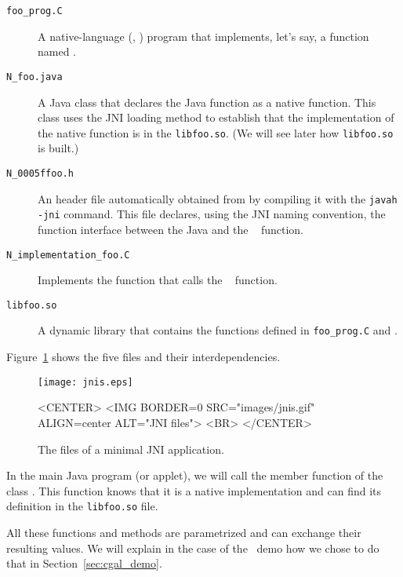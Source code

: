 \begin{description}
\item[{\tt foo\_prog.C}] A native-language (\eg, \CC) program
      that implements, let's say, a function named .
\item[{\tt N\_foo.java}]  A Java class that declares the
     Java function  as a native function. This class uses the
     JNI loading method  to establish that
     the implementation of the native function is in the \texttt{libfoo.so}.
     (We will see later how \texttt{libfoo.so} is built.)
\item[{\tt N\_0005ffoo.h}] An header file automatically obtained 
      from  by compiling it with the \texttt{javah -jni} 
      command. This file declares, using the JNI naming convention, the 
       function interface between the Java  
      and the \CC\  function.
\item[{\tt N\_implementation\_foo.C}] Implements the 
      function that calls the \CC\  function.
\item[{\tt libfoo.so}] A dynamic library that contains
     the functions  defined in \texttt{foo\_prog.C} and 
     .
\end{description}

Figure~\ref{fig:jni_files} shows the five files and their
interdependencies.

\begin{figure}
\begin{ccTexOnly}
\begin{center}
\texttt{[image: jnis.eps]}
\end{center}
\end{ccTexOnly}
\caption{The files of a minimal JNI application.
\label{fig:jni_files}}
\begin{ccHtmlOnly}
<CENTER>
<IMG BORDER=0 SRC="images/jnis.gif" ALIGN=center ALT="JNI files"> <BR>
</CENTER>
\end{ccHtmlOnly}
\end{figure}

In the main Java program (or applet), we will call the 
member function of the class . This function knows that it is a
native implementation and can find its definition in the \texttt{libfoo.so}
file.

All these functions and methods are parametrized and can exchange
their resulting values. We will explain in the case of the \cgal\ demo
how we chose to do that in Section~\ref{sec:cgal_demo}.

